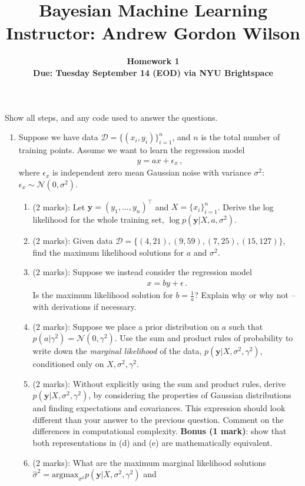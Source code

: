 \documentclass[11pt]{article}
\title{\vspace{-20mm} Bayesian Machine Learning \\ \vspace{5mm}  \normalsize Instructor: Andrew Gordon Wilson}
\date{}
\author{
\textbf{Homework 1} \\ \textbf{Due: Tuesday September 14 (EOD) via NYU Brightspace} }
\newcommand{\mbf}[1]{{\boldsymbol{\mathbf{#1}}}}
\renewcommand{\bm}{\mbf}
\begin{document}
\maketitle

Show all steps, and any code used to answer the questions.

\begin{enumerate}
\item Suppose we have data $\mathcal{D} = \{(x_i, y_i)\}_{i=1}^{n}$, and $n$ is the total number
of training points.  Assume we want to learn the regression model
\begin{align}
y = a x  + \epsilon_x \,,  \label{eqn: first}
\end{align}
where $\epsilon_x$ is independent zero mean Gaussian noise with variance $\sigma^2$: 
$\epsilon_x \sim \mathcal{N}(0,\sigma^2)$.
\begin{enumerate}[label=(\alph*)]
\item (2 marks): Let $\bm{y} = (y_1,\dots,y_n)^{\top}$ and $X = \{x_i\}_{i=1}^{n}$.  Derive the 
log likelihood for the whole training set, $\log p(\bm{y} | X, a, \sigma^2)$.
\item (2 marks): Given data $\mathcal{D} = \{(4,21), (9,59), (7,25), (15,127)\}$, find the maximum
likelihood solutions for $a$ and $\sigma^2$.
\item (2 marks): Suppose we instead consider the regression model 
\begin{align}
x = b y + \epsilon \,.
\end{align}
Is the maximum likelihood solution for $b = \frac{1}{a}$?  Explain why or why not -- with derivations if necessary.
\item (2 marks): Suppose we place a prior distribution on $a$ such that $p(a | \gamma^2) = \mathcal{N}(0,\gamma^2)$.  Use
the sum and product rules of probability to write down the \emph{marginal likelihood} of the data, 
$p(\bm{y} | X, \sigma^2, \gamma^2)$, conditioned only on $X, \sigma^2, \gamma^2$.  
\item (2 marks): Without explicitly using the sum and product rules, derive $p(\bm{y} | X, \sigma^2, \gamma^2)$, by considering 
the properties of Gaussian distributions and finding expectations and covariances.  This expression should look different
than your answer to the previous question.  Comment on the differences in computational complexity.  \textbf{Bonus (1 mark)}:
show that both representations in (d) and (e) are mathematically equivalent.
\item (2 marks): What are the maximum marginal likelihood solutions $\hat{\sigma}^2 =  \text{argmax}_{\sigma^2} p(\bm{y} | X, \sigma^2, \gamma^2)$ and 

\end{enumerate}
\end{enumerate}
\end{document}
